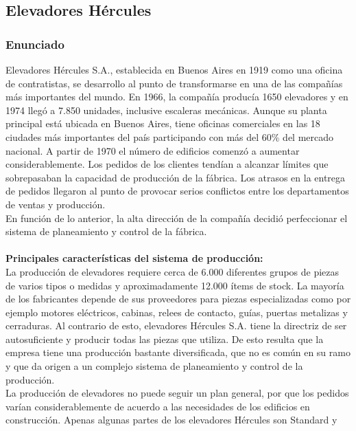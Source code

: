 \documentclass[a4paper,10pt,titlepage]{article}
\begin{document}
\subsection{Elevadores H\'ercules}

\subsubsection{Enunciado}

Elevadores H\'ercules S.A., establecida en Buenos Aires en 1919 como una oficina de
contratistas, se desarrollo al punto de transformarse en una de las compa\~n\'ias m\'as
importantes del mundo. En 1966, la compa\~n\'ia produc\'ia 1650 elevadores y en 1974
lleg\'o a 7.850 unidades, inclusive escaleras mec\'anicas. Aunque su planta principal est\'a
ubicada en Buenos Aires, tiene oficinas comerciales en las 18 ciudades m\'as
importantes del pa\'is participando con m\'as del 60\% del mercado nacional. A partir de
1970 el n\'umero de edificios comenz\'o a aumentar considerablemente. Los pedidos de
los clientes tend\'ian a alcanzar l\'imites que sobrepasaban la capacidad de producci\'on
de la f\'abrica. Los atrasos en la entrega de pedidos llegaron al punto de provocar serios
conflictos entre los departamentos de ventas y producci\'on.\\
En funci\'on de lo anterior, la alta direcci\'on de la compa\~n\'ia decidi\'o perfeccionar el
sistema de planeamiento y control de la f\'abrica.\\ \\
\textbf{Principales caracter\'isticas del sistema de producci\'on:}\\
La producci\'on de elevadores requiere cerca de 6.000 diferentes grupos de piezas de
varios tipos o medidas y aproximadamente 12.000 \'items de stock. La mayor\'ia de los
fabricantes depende de sus proveedores para piezas especializadas como por ejemplo
motores el\'ectricos, cabinas, relees de contacto, gu\'ias, puertas metalizas y cerraduras.
Al contrario de esto, elevadores H\'ercules S.A. tiene la directriz de ser autosuficiente y
producir todas las piezas que utiliza. De esto resulta que la empresa tiene una
producci\'on bastante diversificada, que no es com\'un en su ramo y que da origen a un
complejo sistema de planeamiento y control de la producci\'on.\\
La producci\'on de elevadores no puede seguir un plan general, por que los pedidos
var\'ian considerablemente de acuerdo a las necesidades de los edificios en
construcci\'on. Apenas algunas partes de los elevadores H\'ercules son Standard y
\end{document}
